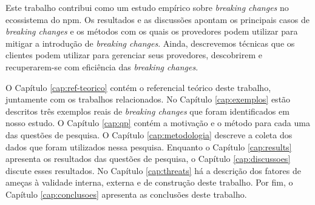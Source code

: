 Este trabalho contribui como um estudo empírico sobre \textit{breaking changes} no ecossistema do \textsf{npm}. Os resultados e as discussões apontam os principais casos de \textit{breaking changes} e os métodos com os quais os provedores podem utilizar para mitigar a introdução de \textit{breaking changes}. Ainda, descrevemos técnicas que os clientes podem utilizar para gerenciar seus provedores, descobrirem e recuperarem-se com eficiência das \textit{breaking changes}.

O Capítulo \ref{cap:ref-teorico} contém o referencial teórico deste trabalho, juntamente com os trabalhos relacionados. No Capítulo \ref{cap:exemplos} estão descritos três exemplos reais de \textit{breaking changes} que foram identificados em nosso estudo. O Capítulo \ref{cap:qp} contém a motivação e o método para cada uma das questões de pesquisa. O Capítulo \ref{cap:metodologia} descreve a coleta dos dados que foram utilizados nessa pesquisa. Enquanto o Capítulo \ref{cap:results} apresenta os resultados das questões de pesquisa, o Capítulo \ref{cap:discussoes} discute esses resultados. No Capítulo \ref{cap:threats} há a descrição dos fatores de ameças à validade interna, externa e de construção deste trabalho. Por fim, o Capítulo \ref{cap:conclusoes} apresenta as conclusões deste trabalho.